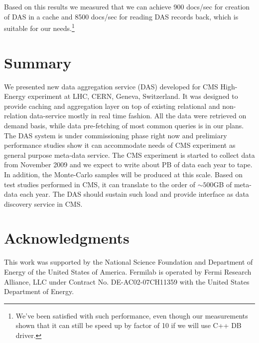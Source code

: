 \documentclass[a4paper]{jpconf}
\begin{document}
Based on this results we measured that we can achieve 900 docs/sec for creation of DAS
in a cache and 8500 docs/sec for reading DAS records back, which is suitable for our
needs.\footnote{We've been satisfied with such performance,
even though our measurements shown that it can still be speed up by factor of
10 if we will use C++ DB driver.}

\section{Summary}
We presented new data aggregation service (DAS) developed for CMS High-Energy experiment
at LHC, CERN, Geneva, Switzerland. It was designed to provide caching and
aggregation layer on top of existing relational and non-relation data-service
mostly in real time fashion. All the data were retrieved on demand basis,
while data pre-fetching of most common queries is in our plans. The DAS system 
is under commissioning phase right now and prelimiary performance studies
show it can accommodate needs of CMS experiment as general purpose meta-data
service. The CMS experiment is started to
collect data from November 2009 and we expect to write about PB of data each
year to tape. In addition, the Monte-Carlo samples will be produced at this scale.
Based on test studies performed in CMS, it can translate to the order of
$\sim500$GB of meta-data each year. The DAS should sustain such load and provide
interface as data discovery service in CMS.

\section{Acknowledgments}

This work was supported by the National Science Foundation and Department of Energy of the United States of America. Fermilab is operated by Fermi Research Alliance, LLC under Contract
No. DE-AC02-07CH11359 with the United States Department of Energy.
\end{document}
